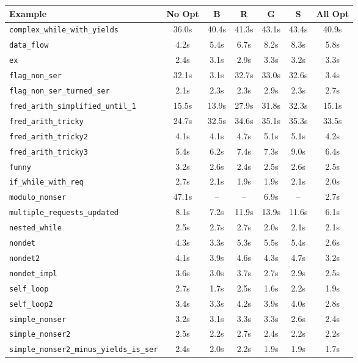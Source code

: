 \begin{tabular}{lcccccc}
\toprule
Example & No Opt & B & R & G & S & All Opt \\
\midrule
\texttt{complex_while_with_yields} & 36.0s & 40.4s & 41.3s & 43.1s & 43.4s & 40.9s \\
\texttt{data_flow} & 4.2s & 5.4s & 6.7s & 8.2s & 8.3s & 5.8s \\
\texttt{ex} & 2.4s & 3.1s & 2.9s & 3.3s & 3.2s & 3.3s \\
\texttt{flag_non_ser} & 32.1s & 3.1s & 32.7s & 33.0s & 32.6s & 3.4s \\
\texttt{flag_non_ser_turned_ser} & 2.1s & 2.3s & 2.3s & 2.9s & 2.3s & 2.7s \\
\texttt{fred_arith_simplified_until_1} & 15.5s & 13.9s & 27.9s & 31.8s & 32.3s & 15.1s \\
\texttt{fred_arith_tricky} & 24.7s & 32.5s & 34.6s & 35.1s & 35.3s & 33.5s \\
\texttt{fred_arith_tricky2} & 4.1s & 4.1s & 4.7s & 5.1s & 5.1s & 4.2s \\
\texttt{fred_arith_tricky3} & 5.4s & 6.2s & 7.4s & 7.3s & 9.0s & 6.4s \\
\texttt{funny} & 3.2s & 2.6s & 2.4s & 2.5s & 2.6s & 2.5s \\
\texttt{if_while_with_req} & 2.7s & 2.1s & 1.9s & 1.9s & 2.1s & 2.0s \\
\texttt{modulo_nonser} & 47.1s & -- & -- & 6.9s & -- & 2.7s \\
\texttt{multiple_requests_updated} & 8.1s & 7.2s & 11.9s & 13.9s & 11.6s & 6.1s \\
\texttt{nested_while} & 2.5s & 2.7s & 2.7s & 2.0s & 2.1s & 2.1s \\
\texttt{nondet} & 4.3s & 3.3s & 5.3s & 5.5s & 5.4s & 2.6s \\
\texttt{nondet2} & 4.1s & 3.9s & 4.6s & 4.3s & 4.7s & 3.2s \\
\texttt{nondet_impl} & 3.6s & 3.0s & 3.7s & 2.7s & 2.9s & 2.5s \\
\texttt{self_loop} & 2.7s & 1.7s & 2.5s & 1.6s & 2.2s & 1.9s \\
\texttt{self_loop2} & 3.4s & 3.3s & 4.2s & 3.9s & 4.0s & 2.8s \\
\texttt{simple_nonser} & 3.2s & 3.1s & 3.3s & 3.3s & 2.6s & 2.4s \\
\texttt{simple_nonser2} & 2.5s & 2.2s & 2.7s & 2.4s & 2.2s & 2.2s \\
\texttt{simple_nonser2_minus_yields_is_ser} & 2.4s & 2.0s & 2.2s & 1.9s & 1.9s & 1.7s \\

\end{tabular}
